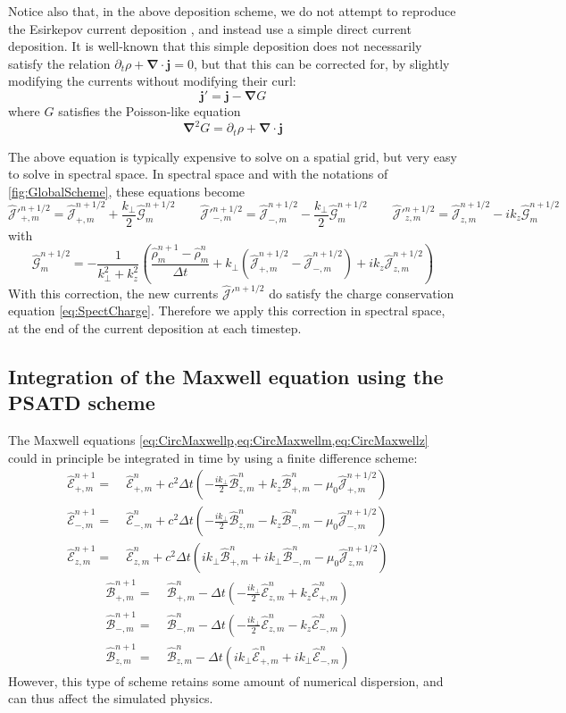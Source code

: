 \documentclass[1p,times,authoryear]{elsarticle}
\newcommand{\tB}[2]{\spectral{B}_{#1,m}^{#2}}
\newcommand{\tE}[2]{\spectral{E}_{#1,m}^{#2}}
\newcommand{\tj}[2]{\spectral{J}_{#1,m}^{#2}}
\renewcommand{\vec}[1]{\boldsymbol{#1}}
\newcommand{\spectral}[1]{\hat{\mathcal{#1}}}
\begin{document}
Notice also that, in the above deposition scheme, we do not attempt to
reproduce the Esirkepov current deposition \citep{Esirkepov}, and instead use a
simple direct current deposition. It is well-known that this simple deposition does not necessarily
satisfy the relation $\partial_t\rho + \vec{\nabla}\cdot\vec{j} =
0$, but that this can be corrected for, by slightly modifying the
currents without modifying their curl:
\[ \vec{j}' = \vec{j} - \vec{\nabla} G \]
where $G$ satisfies the Poisson-like equation
\[ \vec{\nabla}^2 G = \partial_t\rho + \vec{\nabla}\cdot\vec{j} \]

The above equation is typically expensive to solve on a spatial grid, but
very easy to solve in spectral space. In spectral space and with the
notations of \cref{fig:GlobalScheme}, these equations become
\[ \spectral{J}'^{n+1/2}_{+,m} = \spectral{J}^{n+1/2}_{+,m} +
\frac{k_\perp}{2} \spectral{G}^{n+1/2}_m
\qquad
\spectral{J}'^{n+1/2}_{-,m} = \spectral{J}^{n+1/2}_{-,m} - \frac{k_\perp}{2} \spectral{G}^{n+1/2}_m
\qquad \spectral{J}'^{n+1/2}_{z,m} = \spectral{J}^{n+1/2}_{z,m} - ik_z
\spectral{G}^{n+1/2}_m\]
with
\[ \spectral{G}^{n+1/2}_m = - \frac{1}{k_\perp^2 + k_z^2}\left(
  \frac{\spectral{\rho}^{n+1}_m -\spectral{\rho}^{n}_m}{\Delta t} + k_\perp
  (\spectral{J}^{n+1/2}_{+,m} -\spectral{J}^{n+1/2}_{-,m}) + ik_z\spectral{J}^{n+1/2}_{z,m}  \right) \]
With this correction, the new currents $\spectral{J}'^{n+1/2}$ do satisfy
the charge conservation equation \cref{eq:SpectCharge}. Therefore we apply this
correction in spectral space, at the end of the current deposition at each timestep.

\subsection{Integration of the Maxwell equation using the PSATD scheme}
\label{sec:FieldIntegration}

The Maxwell equations
\cref{eq:CircMaxwellp,eq:CircMaxwellm,eq:CircMaxwellz} could in
principle be integrated in time by using a finite difference scheme:
\begin{align*}
\tE{+}{n+1} = \; & \tE{+}{n} + 
c^2\Delta t\left(-\frac{ik_\perp }{2} \tB{z}{n} + k_z\tB{+}{n}
- \mu_0 \tj{+}{n+1/2} \right) & \\
\tE{-}{n+1} =\; & \tE{-}{n} +
c^2\Delta t\left(- \frac{ik_\perp }{2} \tB{z}{n} - k_z\tB{-}{n}
- \mu_0 \tj{-}{n+1/2} \right) &\\
\tE{z}{n+1} =\; & \tE{z}{n} + 
c^2\Delta t\left(ik_\perp \tB{+}{n} + ik_\perp \tB{-}{n}
- \mu_0 \tj{z}{n+1/2} \right)  &
\end{align*}
\begin{align*}
\tB{+}{n+1} = \; & \tB{+}{n} - 
\Delta t\left(-\frac{ik_\perp }{2} \tE{z}{n} + k_z\tE{+}{n}
\right) & \\
\tB{-}{n+1} =\; & \tB{-}{n} - 
\Delta t\left(- \frac{ik_\perp }{2} \tE{z}{n} - k_z\tE{-}{n}
\right) &\\
\tB{z}{n+1} =\; & \tB{z}{n} - 
\Delta t\left(ik_\perp \tE{+}{n} + ik_\perp \tE{-}{n}
\right) &
\end{align*}
However, this type of scheme retains some amount of numerical dispersion, and can
thus affect the simulated physics.
\end{document}
